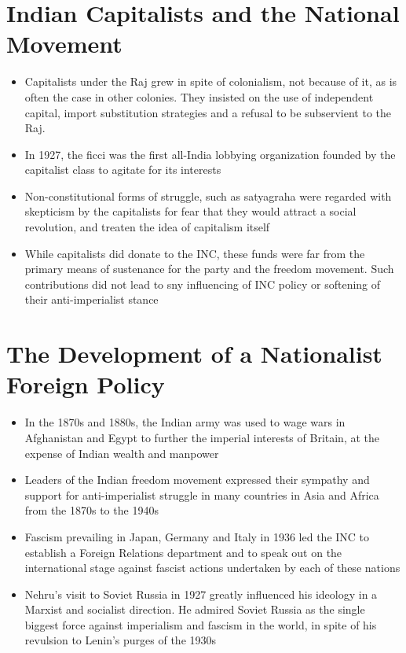 \section{Indian Capitalists and the National Movement}
\begin{itemize}
    \item Capitalists under the Raj grew in spite of colonialism, not because of it, as is often the case in other colonies. They insisted on the use of independent capital, import substitution strategies and a refusal to be subservient to the Raj.
    \item In 1927, the \gls{ficci} was the first all-India lobbying organization founded by the capitalist class to agitate for its interests
    \item Non-constitutional forms of struggle, such as satyagraha were regarded with skepticism by the capitalists for fear that they would attract a social revolution, and treaten the idea of capitalism itself
    \item While capitalists did donate to the INC, these funds were far from the primary means of sustenance for the party and the freedom movement. Such contributions did not lead to sny influencing of INC policy or softening of their anti-imperialist stance
\end{itemize}

\section{The Development of a Nationalist Foreign Policy}
\begin{itemize}
    \item In the 1870s and 1880s, the Indian army was used to wage wars in Afghanistan and Egypt to further the imperial interests of Britain, at the expense of Indian wealth and manpower
    \item Leaders of the Indian freedom movement expressed their sympathy and support for anti-imperialist struggle in many countries in Asia and Africa from the 1870s to the 1940s
    \item Fascism prevailing in Japan, Germany and Italy in 1936 led the INC to establish a Foreign Relations department and to speak out on the international stage against fascist actions undertaken by each of these nations
    \item Nehru's visit to Soviet Russia in 1927 greatly influenced his ideology in a Marxist and socialist direction. He admired Soviet Russia as the single biggest force against imperialism and fascism in the world, in spite of his revulsion to Lenin's purges of the 1930s
\end{itemize}


